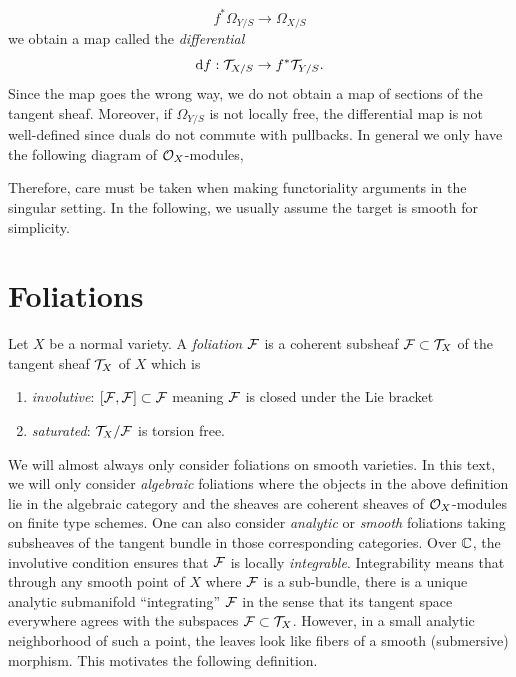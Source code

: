 \documentclass[main.tex]{subfiles}
\begin{document}
\[ f^* \Omega_{Y/S} \to \Omega_{X/S} \]
we obtain a map called the \textit{differential}
\[ \mathrm{d}{f} : \mathcal{T}_{X/S} \to f^* \mathcal{T}_{Y/S}. \]
Since the map goes the wrong way, we do not obtain a map of sections of the tangent sheaf. Moreover, if $\Omega_{Y/S}$ is not locally free, the differential map is not well-defined since duals do not commute with pullbacks. In general we only have the following diagram of $\mathcal{O}_X$-modules,
\begin{center}
\end{center}
Therefore, care must be taken when making functoriality arguments in the singular setting. In the following, we usually assume the target is smooth for simplicity.

\section{Foliations}

\begin{defn}
Let $X$ be a normal variety. A \textit{foliation} $\mathcal{F}$ is a coherent subsheaf $\mathcal{F} \subset \mathcal{T}_X$ of the tangent sheaf $\mathcal{T}_X$ of $X$ which is
\begin{enumerate}
    \item \textit{involutive}: $[\mathcal{F}, \mathcal{F}] \subset \mathcal{F}$ meaning $\mathcal{F}$ is closed under the Lie bracket
    \item \textit{saturated}: $\mathcal{T}_X / \mathcal{F}$ is torsion free.
\end{enumerate}
\end{defn}

We will almost always only consider foliations on smooth varieties.
In this text, we will only consider \textit{algebraic} foliations where the objects in the above definition lie in the algebraic category and the sheaves are coherent sheaves of $\mathcal{O}_X$-modules on finite type schemes. 
One can also consider \textit{analytic} or \textit{smooth} foliations taking subsheaves of the tangent bundle in those corresponding categories. Over $\mathbb{C}$, the involutive condition ensures that $\mathcal{F}$ is locally \textit{integrable}. Integrability means that through any smooth point of $X$ where $\mathcal{F}$ is a sub-bundle, there is a unique analytic submanifold ``integrating'' $\mathcal{F}$ in the sense that its tangent space everywhere agrees with the subspaces $\mathcal{F} \subset \mathcal{T}_X$. However, in a small analytic neighborhood of such a point, the leaves look like fibers of a smooth (submersive) morphism. This motivates the following definition. 
\end{document}
